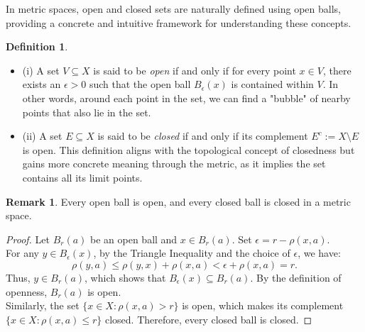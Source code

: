 \documentclass[12pt, reqno]{amsart}
\theoremstyle{definition}
\newtheorem{definition}[theorem]{Definition}
\newtheorem{remark}[theorem]{Remark}
\numberwithin{equation}{section}
\begin{document}
In metric spaces, open and closed sets are naturally defined using open balls, providing a concrete and intuitive framework for understanding these concepts.
\begin{definition} \hfill
\begin{itemize}
    \item {(i) A set \(V \subseteq X\) is said to be \textit{open} if and only if for every point \(x \in V\), there exists an \(\epsilon > 0\) such that the open ball \(B_\epsilon(x)\) is contained within \(V\). In other words, around each point in the set, we can find a "bubble" of nearby points that also lie in the set.}
    \item {(ii) A set \(E \subseteq X\) is said to be \textit{closed} if and only if its complement \(E^c := X \setminus E\) is open. This definition aligns with the topological concept of closedness but gains more concrete meaning through the metric, as it implies the set contains all its limit points.}
\end{itemize}
\end{definition}
\pagebreak
\begin{remark}
    Every open ball is open, and every closed ball is closed in a metric space.
\end{remark}

\begin{proof}
    Let \(B_r(a)\) be an open ball and \(x \in B_r(a)\). Set \(\epsilon = r - \rho(x, a)\).\\
    For any \(y \in B_\epsilon(x)\), by the Triangle Inequality and the choice of \(\epsilon\), we have:
    \[
    \rho(y, a) \leq \rho(y, x) + \rho(x, a) < \epsilon + \rho(x, a) = r.
    \]
    Thus, \(y \in B_r(a)\), which shows that \(B_\epsilon(x) \subseteq B_r(a)\). By the definition of openness, \(B_r(a)\) is open.\\
    Similarly, the set \(\{x \in X : \rho(x, a) > r\}\) is open, which makes its complement \(\{x \in X : \rho(x, a) \leq r\}\) closed. Therefore, every closed ball is closed.
\end{proof}
\end{document}
